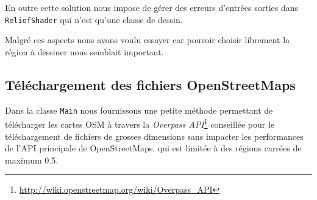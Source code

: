 \documentclass[11pt,a4paper]{article}
\begin{document}
En outre cette solution nous impose de gérer des erreurs d'entrées sorties dans \texttt{ReliefShader} qui n'est qu'une classe de dessin.

Malgré ces aspects nous avons voulu essayer car pouvoir choisir librement la région à dessiner nous semblait important.

\subsection{Téléchargement des fichiers OpenStreetMaps}
Dans la classe \texttt{Main} nous fournissons une petite méthode permettant de télécharger les cartes OSM à travers la \textit{Overpass API}\footnote{\url{http://wiki.openstreetmap.org/wiki/Overpass_API}} conseillée pour le téléchargement de fichiers de grosses dimensions sans impacter les performances de l'API principale de OpenStreetMaps, qui est limitée à des régions carrées de maximum 0.5\degre.
\end{document}
